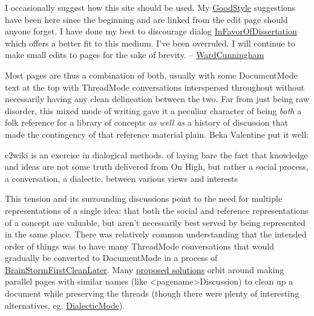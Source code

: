 \begin{leftbar}
I occasionally suggest how this site should be used. My
\href{http://wiki.c2.com/?GoodStyle}{GoodStyle} suggestions have been
here since the beginning and are linked from the edit page should anyone
forget. I have done my best to discourage dialog
\href{http://wiki.c2.com/?InFavorOfDissertation}{InFavorOfDissertation}
which offers a better fit to this medium. I've been overruled. I will
continue to make small edits to pages for the sake of brevity. --
\href{http://wiki.c2.com/?WardCunningham}{WardCunningham} \citep{C2wikiWikiHistory} 
\end{leftbar}

Most pages are thus a combination of both, usually with some
DocumentMode text at the top with ThreadMode conversations interspersed
throughout without necessarily having any clean delineation between the
two. Far from just being raw disorder, this mixed mode of writing gave
it a peculiar character of being \emph{both} a folk reference for a
library of concepts \emph{as well as} a history of discussion that made
the contingency of that reference material plain. Beka Valentine put it
well:

\begin{leftbar}
c2wiki is an exercise in dialogical methods. of laying bare the fact
that knowledge and ideas are not some truth delivered from On High, but
rather a social process, a conversation, a dialectic, between various
views and interests \citep{valentineC2wikiExerciseDialogical2021} 
\end{leftbar}

This tension and its surrounding discussions point to the need for
multiple representations of a single idea: that both the social and
reference representations of a concept are valuable, but aren't
necessarily best served by being represented in the same place. There
was relatively common understanding that the intended order of things
was to have many ThreadMode conversations that would gradually be
converted to DocumentMode in a process of
\href{http://wiki.c2.com/?BrainStormFirstCleanLater}{BrainStormFirstCleanLater}.
Many \href{http://wiki.c2.com/?ConvertThreadModeToDocumentMode}{proposed
solutions} orbit around making parallel pages with similar names (like
\textless pagename\textgreater Discussion) to clean up a document while
preserving the threads (though there were plenty of interesting
alternatives, eg.
\href{http://wiki.c2.com/?DialecticMode}{DialecticMode}).

